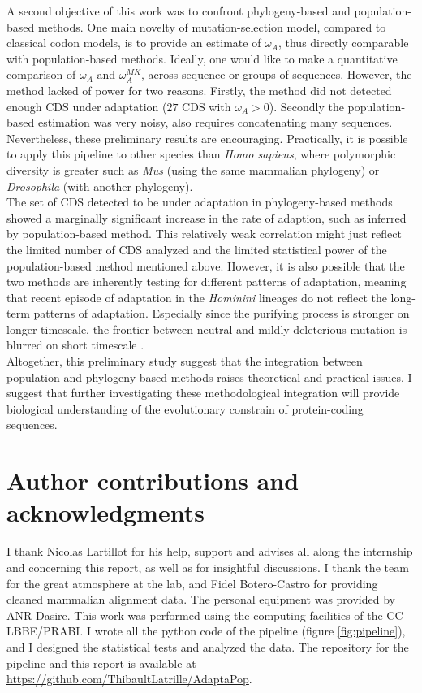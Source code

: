 \documentclass{article}
\begin{document}
	A second objective of this work was to confront phylogeny-based and population-based methods. One main novelty of mutation-selection model, compared to classical codon models, is to provide an estimate of $\omega_A$, thus directly comparable with population-based methods. Ideally, one would like to make a quantitative comparison of $\omega_A$ and $\omega_A^{MK}$, across sequence or groups of sequences. However, the method lacked of power for two reasons. Firstly, the method did not detected enough CDS under adaptation ($27$ CDS with $\omega_A > 0$). Secondly the population-based estimation was very noisy, also requires concatenating many sequences. Nevertheless, these preliminary results are encouraging. Practically, it is possible to apply this pipeline to other species than \textit{Homo sapiens}, where polymorphic diversity is greater such as \textit{Mus} (using the same mammalian phylogeny) or \textit{Drosophila} (with another phylogeny). \\
	
	The set of CDS detected to be under adaptation in phylogeny-based methods showed a marginally significant increase in the rate of adaption, such as inferred by population-based method. This relatively weak correlation might just reflect the limited number of CDS analyzed and the limited statistical power of the population-based method mentioned above. However, it is also possible that the two methods are inherently testing for different patterns of adaptation, meaning that recent episode of adaptation in the \textit{Hominini} lineages do not reflect the long-term patterns of adaptation. Especially since the purifying process is stronger on longer timescale, the frontier between neutral and mildly deleterious mutation is blurred on short timescale \cite{ho_time_2005}. \\
	
	Altogether, this preliminary study suggest that the integration between population and phylogeny-based methods raises theoretical and practical issues. I suggest that further investigating these methodological integration will provide biological understanding of the evolutionary constrain of protein-coding sequences. \\
	
	\section*{Author contributions and acknowledgments}
	I thank Nicolas Lartillot for his help, support and advises all along the internship and concerning this report, as well as for insightful discussions. I thank the team for the great atmosphere at the lab, and Fidel Botero-Castro for providing cleaned mammalian alignment data. The personal equipment was provided by ANR Dasire. This work was performed using the computing  facilities of the CC LBBE/PRABI. I wrote all the python code of the pipeline (figure \ref{fig:pipeline}), and I designed the statistical tests and analyzed the data. The repository for the pipeline and this report is available at \href{https://github.com/ThibaultLatrille/AdaptaPop}{https://github.com/ThibaultLatrille/AdaptaPop}.

	
	
	
\end{document}
